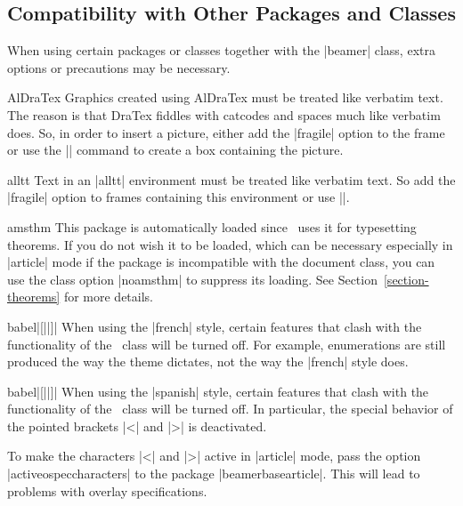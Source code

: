 %
%
%

\subsection{Compatibility with Other Packages and Classes}

When using certain packages or classes together with the |beamer| class, extra options or precautions may be necessary.

\begin{package}{{AlDraTex}}
  Graphics created using AlDraTex must be treated like verbatim text. The reason is that DraTex fiddles with catcodes and spaces much like verbatim does. So, in order to insert a picture, either add the |fragile| option to the frame or use the || command to create a box containing the picture.
\end{package}

\begin{package}{{alltt}}
  Text in an |alltt| environment must be treated like verbatim text. So add the |fragile| option to frames containing this environment or use ||.
\end{package}

\begin{package}{{amsthm}}
  This package is automatically loaded since \beamer\ uses it for typesetting theorems. If you do not wish it to be loaded, which can be necessary especially in |article| mode if the package is incompatible with the document class, you can use the class option |noamsthm| to suppress its loading. See Section~\ref{section-theorems} for more details.
\end{package}

\begin{package}{{babel}|[||]|}
  When using the |french| style, certain features that clash with the functionality of the \beamer\ class will be turned off. For example, enumerations are still produced the way the theme dictates, not the way the |french| style does.
\end{package}

\begin{package}{{babel}|[||]|}
  \beamernote
  When using the |spanish| style, certain features that clash with the functionality of the \beamer\ class will be turned off. In particular, the special behavior of the pointed brackets |<| and |>| is deactivated.

  \articlenote
  To make the characters |<| and |>| active in |article| mode, pass the option |activeospeccharacters| to the package |beamerbasearticle|. This will lead to problems with overlay specifications.
\end{package}

